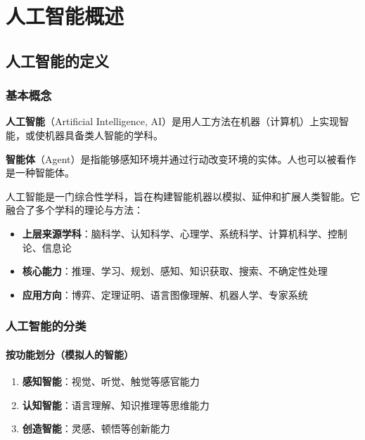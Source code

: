 \chapter{人工智能概述}

\section{人工智能的定义}

\subsection{基本概念}
\begin{conceptbox}
\textbf{人工智能}（Artificial Intelligence, AI）是用人工方法在机器（计算机）上实现智能，或使机器具备类人智能的学科。

\textbf{智能体}（Agent）是指能够感知环境并通过行动改变环境的实体。人也可以被看作是一种智能体。
\end{conceptbox}

人工智能是一门综合性学科，旨在构建智能机器以模拟、延伸和扩展人类智能。它融合了多个学科的理论与方法：
\begin{itemize}[leftmargin=2em,itemsep=0pt]
    \item \textbf{上层来源学科}：脑科学、认知科学、心理学、系统科学、计算机科学、控制论、信息论
    \item \textbf{核心能力}：推理、学习、规划、感知、知识获取、搜索、不确定性处理
    \item \textbf{应用方向}：博弈、定理证明、语言图像理解、机器人学、专家系统
\end{itemize}

\subsection{人工智能的分类}

\subsubsection{按功能划分（模拟人的智能）}
\begin{enumerate}[leftmargin=2em,itemsep=0pt]
    \item \textbf{感知智能}：视觉、听觉、触觉等感官能力
    \item \textbf{认知智能}：语言理解、知识推理等思维能力
    \item \textbf{创造智能}：灵感、顿悟等创新能力
\end{enumerate}

